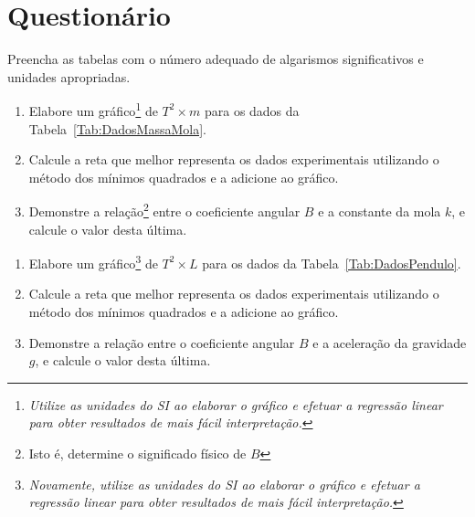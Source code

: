 \vspace{5mm}

\section{Questionário}

\begin{question}[type={exam}]
Preencha as tabelas com o número adequado de algarismos significativos e unidades apropriadas. 
\end{question}

\begin{question}[type={exam}]
\begin{enumerate}[label=\roman*.]
\item Elabore um gráfico\footnote{\emph{Utilize as unidades do SI ao elaborar o gráfico e efetuar a regressão linear para obter resultados de mais fácil interpretação.}} de $T^2 \times m$ para os dados da Tabela~\ref{Tab:DadosMassaMola}.
\item Calcule a reta que melhor representa os dados experimentais utilizando o método dos mínimos quadrados e a adicione ao gráfico.
\item Demonstre a relação\footnote{Isto é, determine o significado físico de $B$} entre o coeficiente angular $B$ e a constante da mola $k$, e calcule o valor desta última.
\end{enumerate}
\end{question}

\begin{question}[type={exam}]
\begin{enumerate}[label=\roman*.]
\item Elabore um gráfico\footnote{\emph{Novamente, utilize as unidades do SI ao elaborar o gráfico e efetuar a regressão linear para obter resultados de mais fácil interpretação.}} de $T^2 \times L$ para os dados da Tabela~\ref{Tab:DadosPendulo}.
\item Calcule a reta que melhor representa os dados experimentais utilizando o método dos mínimos quadrados e a adicione ao gráfico.
\item Demonstre a relação entre o coeficiente angular $B$ e a aceleração da gravidade $g$, e calcule o valor desta última.
\end{enumerate}
\end{question}

